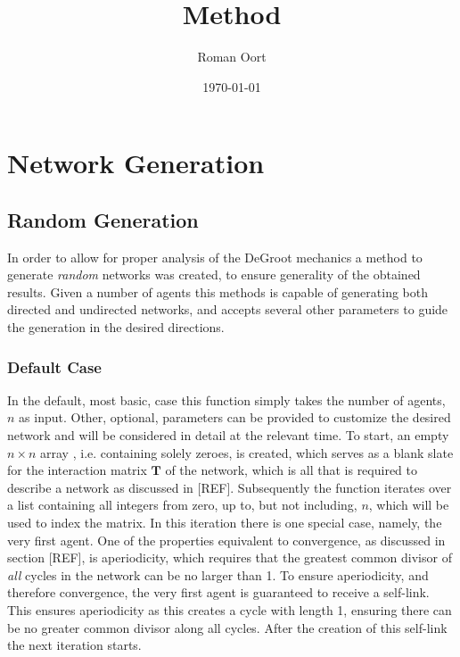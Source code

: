 \documentclass{article}
\title{Method}
\author{Roman Oort}
\date{\today}
\newcommand{\T}{\textbf{T}}
\begin{document}
\maketitle

\tableofcontents
\newpage
\section{Network Generation}

\subsection{Random Generation}

In order to allow for proper analysis of the DeGroot mechanics a method to generate \emph{random} networks was created, to ensure generality of the obtained results. Given a number of agents this methods is capable of generating both directed and undirected networks, and accepts several other parameters to guide the generation in the desired directions.

\subsubsection{Default Case}
In the default, most basic, case this function simply takes the number of agents, $n$ as input. Other, optional, parameters can be provided to customize the desired network and will be considered in detail at the relevant time.
To start, an empty $n\times n$ array \cite{2020NumPy-Array}, i.e. containing solely zeroes, is created, which serves as a blank slate for the interaction matrix $\T$ of the network, which is all that is required to describe a network as discussed in [REF].
Subsequently the function iterates over a list containing all integers from zero, up to, but not including, $n$, which will be used to index the matrix. \newline
In this iteration there is one special case, namely, the very first agent. One of the properties equivalent to convergence, as discussed in section [REF], is aperiodicity, which requires that the greatest common divisor of \emph{all} cycles in the network can be no larger than 1. To ensure aperiodicity, and therefore convergence, the very first agent is guaranteed to receive a self-link. This ensures aperiodicity as this creates a cycle with length 1, ensuring there can be no greater common divisor along all cycles. After the creation of this self-link the next iteration starts. \newline
\end{document}
